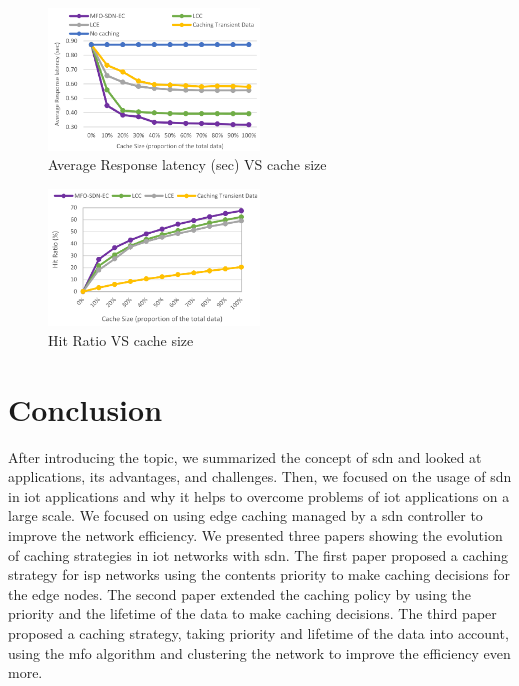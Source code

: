 \documentclass[conference]{IEEEtran}
\begin{document}
	\begin{figure}
		\centering
		\includegraphics[width=0.5\textwidth]{figures/latency-caching.png}
		\caption{Average Response latency (sec) VS cache size \cite{caching-1}}
		\label{fig:latency-caching}
	\end{figure}

	\begin{figure}
		\centering
		\includegraphics[width=0.5\textwidth]{figures/hitrate-caching.png}
		\caption{Hit Ratio VS cache size \cite{caching-1}}
		\label{fig:hitrate-caching}
	\end{figure}

	\section{Conclusion}
	\label{sec:conclusion}

	After introducing the topic, we summarized the concept of \ac{sdn} and looked at applications, its advantages, and challenges. Then, we focused on the usage of \ac{sdn} in \ac{iot} applications and why it helps to overcome problems of \ac{iot} applications on a large scale. We focused on using edge caching managed by a \ac{sdn} controller to improve the network efficiency. We presented three papers showing the evolution of caching strategies in \ac{iot} networks with \ac{sdn}. The first paper \cite{caching-7} proposed a caching strategy for \ac{isp} networks using the contents priority to make caching decisions for the edge nodes. The second paper \cite{caching-2} extended the caching policy by using the priority and the lifetime of the data to make caching decisions. The third paper \cite{caching-1} proposed a caching strategy, taking priority and lifetime of the data into account, using the \ac{mfo} algorithm and clustering the network to improve the efficiency even more.
\end{document}
